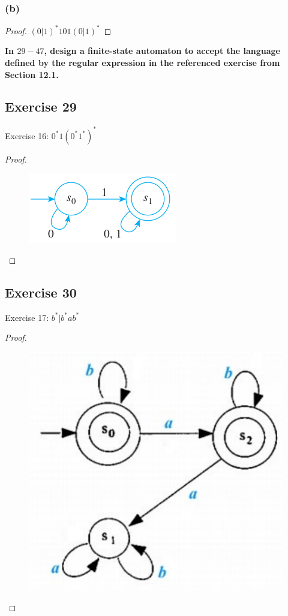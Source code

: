 \documentclass[14pt]{extarticle}
\newcommand{\cy}{\color{cyan}}
\begin{document}
\subsubsection{(b)}
\begin{proof}
    \((0|1)^*101(0|1)^*\)
\end{proof}

{\bf \cy In \(29-47\), design a finite-state automaton to accept the language defined by the regular expression in the
referenced exercise from Section 12.1.}

\subsection{Exercise 29}
Exercise 16: \(0^*1(0^*1^*)^*\)
\begin{proof}
    \begin{figure}[ht!]
        \centering
        \includegraphics[scale=0.5]{../images/12.2.29.png}
    \end{figure}
\end{proof}

\subsection{Exercise 30}
Exercise 17: \(b^* | b^*ab^*\)
\begin{proof}
    \begin{figure}[ht!]
        \centering
        \includegraphics[scale=0.3]{../images/12.2.30.png}
    \end{figure}
\end{proof}
\end{document}
